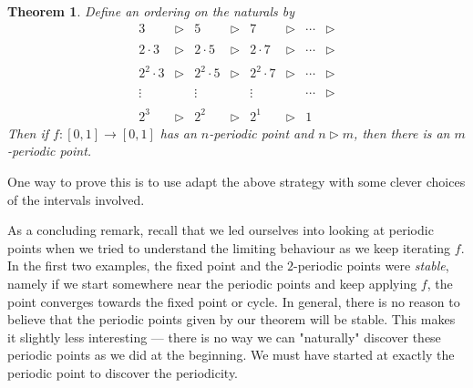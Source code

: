 \documentclass{shortart}
\newtheorem*{thm}{Theorem}
\theoremstyle{definition}
\begin{document}
\begin{thm}
  Define an ordering on the naturals by
  \[
    \begin{array}{cccccccc}
      3 &\rhd& 5 &\rhd& 7 &\rhd& \cdots &\rhd\\\\ 2\cdot 3 &\rhd& 2 \cdot 5 & \rhd & 2 \cdot 7 & \rhd & \cdots & \rhd\\\\ 2^2\cdot 3 &\rhd& 2^2 \cdot 5 & \rhd & 2^2 \cdot 7 & \rhd & \cdots & \rhd\\\\ \vdots & & \vdots & & \vdots & & \cdots & \rhd\\\\ 2^3 & \rhd & 2^2 & \rhd & 2^1 & \rhd & 1
    \end{array}
  \]
  Then if $f: [0, 1] \to [0, 1]$ has an $n$-periodic point and $n \rhd m$, then there is an $m$-periodic point.
\end{thm}

One way to prove this is to use adapt the above strategy with some clever choices of the intervals involved.

As a concluding remark, recall that we led ourselves into looking at periodic points when we tried to understand the limiting behaviour as we keep iterating $f$. In the first two examples, the fixed point and the $2$-periodic points were \emph{stable}, namely if we start somewhere near the periodic points and keep applying $f$, the point converges towards the fixed point or cycle. In general, there is no reason to believe that the periodic points given by our theorem will be stable. This makes it slightly less interesting --- there is no way we can "naturally" discover these periodic points as we did at the beginning. We must have started at exactly the periodic point to discover the periodicity.
\end{document}
